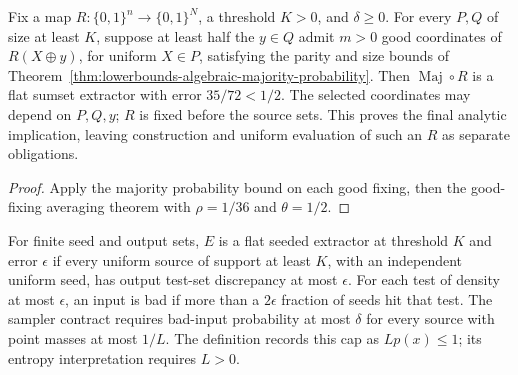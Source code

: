 \begin{theorem}
  \label{thm:lowerbounds-algebraic-extractor-parity-target}
  \leanok
  Fix a map $R:\{0,1\}^n\to\{0,1\}^N$, a threshold $K>0$,
  and $\delta\ge0$. For every $P,Q$ of size at least $K$, suppose
  at least half the $y\in Q$ admit $m>0$ good coordinates of
  $R(X\oplus y)$, for uniform $X\in P$, satisfying the parity and
  size bounds of Theorem~\ref{thm:lowerbounds-algebraic-majority-probability}.
  Then $\operatorname{Maj}\circ R$ is a flat sumset extractor with
  error $35/72<1/2$. The selected coordinates may depend on $P,Q,y$;
  $R$ is fixed before the source sets. This proves the final analytic
  implication, leaving construction and uniform evaluation of such an $R$
  as separate obligations.
\end{theorem}
\begin{proof}
  \leanok
  Apply the majority probability bound on each good fixing, then the
  good-fixing averaging theorem with $\rho=1/36$ and $\theta=1/2$.
\end{proof}

\begin{definition}
  \label{def:lowerbounds-algebraic-extractor-sampler}
  \leanok
  For finite seed and output sets, $E$ is a flat seeded extractor at
  threshold $K$ and error $\epsilon$ if every uniform source of support
  at least $K$, with an independent uniform seed, has output test-set
  discrepancy at most $\epsilon$. For each test of density at most
  $\epsilon$, an input is bad if more than a $2\epsilon$ fraction of
  seeds hit that test. The sampler contract requires bad-input probability
  at most $\delta$ for every source with point masses at most $1/L$.
  The definition records this cap as $Lp(x)\le1$; its entropy
  interpretation requires $L>0$.
\end{definition}

